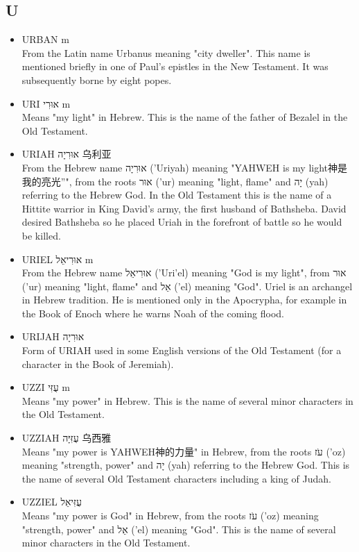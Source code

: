 \subsection{U}
\begin{itemize}
\itemsep-.5em 
\item URBAN m \\
From the Latin name Urbanus meaning "city dweller". This name is mentioned briefly in one of Paul's epistles in the New Testament. It was subsequently borne by eight popes.
\item URI אוּרִי m \\
Means "my light" in Hebrew. This is the name of the father of Bezalel in the Old Testament.
\item URIAH אוּרִיָה 乌利亚 \\
From the Hebrew name אוּרִיָה ('Uriyah) meaning "YAHWEH is my light神是我的亮光”", from the roots אוּר ('ur) meaning "light, flame" and יָה (yah) referring to the Hebrew God. In the Old Testament this is the name of a Hittite warrior in King David's army, the first husband of Bathsheba. David desired Bathsheba so he placed Uriah in the forefront of battle so he would be killed.
\item URIEL אוּרִיאֵל m \\
From the Hebrew name אוּרִיאֵל ('Uri'el) meaning "God is my light", from אוּר ('ur) meaning "light, flame" and אֵל ('el) meaning "God". Uriel is an archangel in Hebrew tradition. He is mentioned only in the Apocrypha, for example in the Book of Enoch where he warns Noah of the coming flood.
\item URIJAH אוּרִיָה  \\
Form of URIAH used in some English versions of the Old Testament (for a character in the Book of Jeremiah).
\item UZZI עֻזִּי m \\
Means "my power" in Hebrew. This is the name of several minor characters in the Old Testament.
\item UZZIAH עֻזִּיָּה 乌西雅 \\
Means "my power is YAHWEH神的力量" in Hebrew, from the roots עֹז ('oz) meaning "strength, power" and יָה (yah) referring to the Hebrew God. This is the name of several Old Testament characters including a king of Judah.
\item UZZIEL עֻזִּיאֵל \\
Means "my power is God" in Hebrew, from the roots עֹז ('oz) meaning "strength, power" and אֵל ('el) meaning "God". This is the name of several minor characters in the Old Testament.
\end{itemize}

